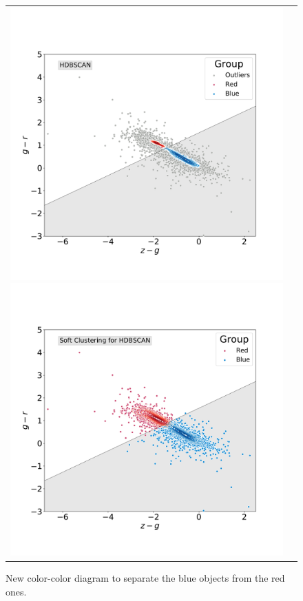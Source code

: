 \documentclass[fleqn,usenatbib]{mnras}
\begin{document}
{\begin{figure}
\centering
\begin{tabular}{l l}
  \includegraphics[width=0.5\linewidth, trim=10 10 5 8, clip]{Figs/blued-red-hdbscan.pdf}
   \includegraphics[width=0.5\linewidth, trim=10 10 5 8. clip]{Figs/blue-red-hdbscan-soft-alternative.pdf}
  \end{tabular}  
  \caption{New color-color diagram to separate the blue objects from the red ones.}
\label{fig:hdbscan}
\end{figure}


}
\end{document}
